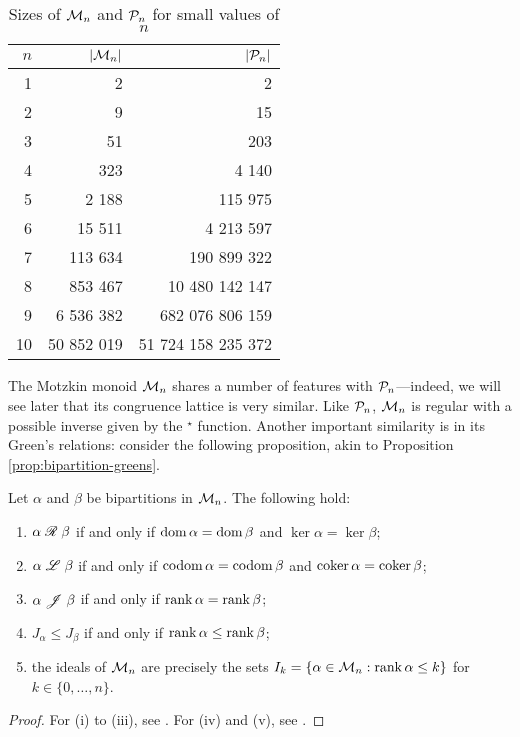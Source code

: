 \begin{table}[h]
  \centering
  \renewcommand\arraystretch{1.0}
  \begin{tabular}{| r | r | r |}
    \hline
    $n$ & $|\mathcal{M}_n|$ & $|\mathcal{P}_n|$ \\
    \hline
     1 &           2 &                  2 \\
     2 &           9 &                 15 \\
     3 &          51 &                203 \\
     4 &         323 &              4 140 \\
     5 &       2 188 &            115 975 \\
     6 &      15 511 &          4 213 597 \\
     7 &     113 634 &        190 899 322 \\
     8 &     853 467 &     10 480 142 147 \\
     9 &   6 536 382 &    682 076 806 159 \\
    10 &  50 852 019 & 51 724 158 235 372 \\
    \hline
  \end{tabular}
  \renewcommand\arraystretch{0.7}
  \caption{Sizes of $\mathcal{M}_n$ and $\mathcal{P}_n$ for small values of $n$}
  \label{tab:mn-size}
\end{table}

The Motzkin monoid $\mathcal{M}_n$ shares a number of features with $\mathcal{P}_n$---indeed,
we will see later that its congruence lattice is very similar.  Like $\mathcal{P}_n$,
$\mathcal{M}_n$ is regular with a possible inverse given by the $^\star$
function. Another important similarity is in its Green's relations: consider the
following proposition, akin to Proposition \ref{prop:bipartition-greens}.

\begin{proposition}
  \label{prop:mn-greens}
  Let $\alpha$ and $\beta$ be bipartitions in $\mathcal{M}_n$.  The following hold:
  \begin{enumerate}[\rm(i)]
  \item $\alpha \mathrel{\mathscr{R}} \beta$ if and only if $\operatorname{dom} \alpha = \operatorname{dom} \beta$ and
    $\ker \alpha = \ker \beta$;
  \item $\alpha \mathrel{\mathscr{L}} \beta$ if and only if $\operatorname{codom} \alpha = \operatorname{codom} \beta$ and
    $\operatorname{coker} \alpha = \operatorname{coker} \beta$;
  \item $\alpha \mathrel{\mathscr{J}} \beta$ if and only if $\operatorname{rank} \alpha = \operatorname{rank} \beta$;
  \item $J_\alpha \leq J_\beta$ if and only if $\operatorname{rank} \alpha \leq \operatorname{rank} \beta$;
  \item the ideals of $\mathcal{M}_n$ are precisely the sets
    $I_k=\{\alpha \in \mathcal{M}_n : \operatorname{rank} \alpha \leq k\}$ for
    $k \in \{0, \ldots, n\}$.
  \end{enumerate}
  \begin{proof}
    For (i) to (iii), see \cite[Theorem 2.4]{deg_motzkin}.  For (iv) and (v),
    see \cite[Proposition 2.6]{deg_motzkin}.
  \end{proof}
\end{proposition}

